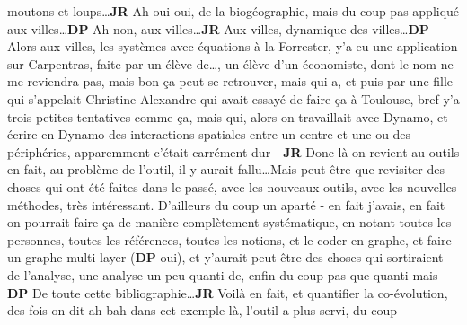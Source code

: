 \documentclass[12pt]{article}
\begin{document}
moutons et loups\ldots \textbf{JR} Ah oui oui, de la biogéographie, mais du coup pas appliqué aux villes\ldots \textbf{DP} Ah non, aux villes\ldots \textbf{JR} Aux villes, dynamique des villes\ldots \textbf{DP} Alors aux villes, les systèmes avec équations à la Forrester, y'a eu une application sur Carpentras, faite par un élève de\ldots, un élève d'un économiste, dont le nom ne me reviendra pas, mais bon ça peut se retrouver, mais qui a, et puis par une fille qui s'appelait Christine Alexandre qui avait essayé de faire ça à Toulouse, bref y'a trois petites tentatives comme ça, mais qui, alors on travaillait avec Dynamo, et écrire en Dynamo des interactions spatiales entre un centre et une ou des périphéries, apparemment c'était carrément dur - \textbf{JR} Donc là on revient au outils en fait, au problème de l'outil, il y aurait fallu\ldots Mais peut être que revisiter des choses qui ont été faites dans le passé, avec les nouveaux outils, avec les nouvelles méthodes, très intéressant. D'ailleurs du coup un aparté - en fait j'avais, en fait on pourrait faire ça de manière complètement systématique, en notant toutes les personnes, toutes les références, toutes les notions, et le coder en graphe, et faire un graphe multi-layer (\textbf{DP} oui), et y'aurait peut être des choses qui sortiraient de l'analyse, une analyse un peu quanti de, enfin du coup pas que quanti mais - \textbf{DP} De toute cette bibliographie\ldots \textbf{JR} Voilà en fait, et quantifier la co-évolution, des fois on dit ah bah dans cet exemple là, l'outil a plus servi, du coup %
\end{document}
